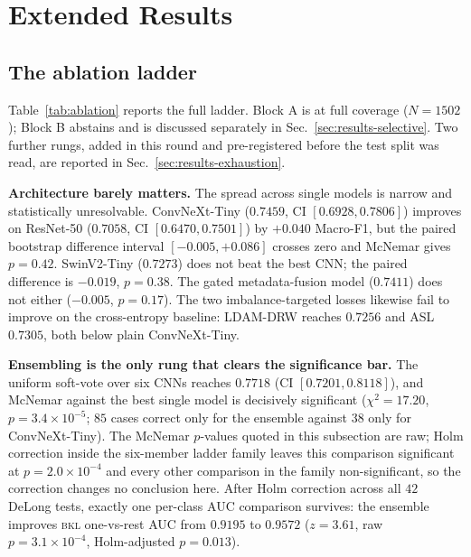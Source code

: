 \documentclass[journal]{IEEEtran}
\begin{document}

\section{Extended Results}
\label{app:extresults}

\subsection{The ablation ladder}
\label{sec:results-ladder}

Table~\ref{tab:ablation} reports the full ladder. Block A is at full coverage
($N=1502$); Block B abstains and is discussed separately in
Sec.~\ref{sec:results-selective}. Two further rungs, added in this round and pre-registered
before the test split was read, are reported in Sec.~\ref{sec:results-exhaustion}.



\textbf{Architecture barely matters.} The spread across single models is narrow and
statistically unresolvable. ConvNeXt-Tiny ($0.7459$, CI $[0.6928, 0.7806]$) improves on
ResNet-50 ($0.7058$, CI $[0.6470, 0.7501]$) by $+0.040$ Macro-F1, but the paired bootstrap
difference interval $[-0.005, +0.086]$ crosses zero and McNemar gives $p=0.42$. SwinV2-Tiny
($0.7273$) does not beat the best CNN; the paired difference is $-0.019$, $p=0.38$. The
gated metadata-fusion model ($0.7411$) does not either ($-0.005$, $p=0.17$). The two
imbalance-targeted losses likewise fail to improve on the cross-entropy baseline:
LDAM-DRW reaches $0.7256$ and ASL $0.7305$, both below plain ConvNeXt-Tiny.

\textbf{Ensembling is the only rung that clears the significance bar.} The uniform soft-vote
over six CNNs reaches $0.7718$ (CI $[0.7201, 0.8118]$), and McNemar against the best single
model is decisively significant ($\chi^2 = 17.20$, $p = 3.4\times10^{-5}$; $85$ cases
correct only for the ensemble against $38$ only for ConvNeXt-Tiny). The McNemar $p$-values
quoted in this subsection are raw; Holm correction inside the six-member ladder family leaves
this comparison significant at $p=2.0\times10^{-4}$ and every other comparison in the family
non-significant, so the correction changes no conclusion here. After Holm correction across
all $42$ DeLong tests, exactly one per-class AUC comparison survives: the ensemble
improves \textsc{bkl} one-vs-rest AUC from $0.9195$ to $0.9572$ ($z=3.61$, raw $p=3.1\times
10^{-4}$, Holm-adjusted $p=0.013$).
\end{document}
